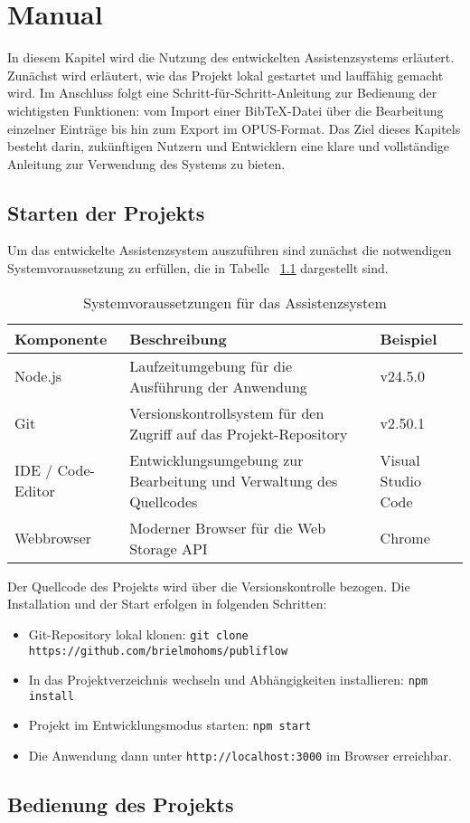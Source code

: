 \chapter{Manual}
In diesem Kapitel wird die Nutzung des entwickelten Assistenzsystems erläutert. 
Zunächst wird erläutert, wie das Projekt lokal gestartet und lauffähig gemacht 
wird. Im Anschluss folgt eine Schritt-für-Schritt-Anleitung zur Bedienung der 
wichtigsten Funktionen: vom Import einer BibTeX-Datei über die Bearbeitung 
einzelner Einträge bis hin zum Export im OPUS-Format. Das Ziel dieses Kapitels 
besteht darin, zukünftigen Nutzern und Entwicklern eine klare und vollständige 
Anleitung zur Verwendung des Systems zu bieten.


\section{Starten der Projekts}
Um das entwickelte Assistenzsystem auszuführen sind zunächst
die notwendigen Systemvoraussetzung zu erfüllen, die in Tabelle
~\ref{tab:systemvoraussetzungen} dargestellt sind. 

\begin{table}[h]
\centering
\begin{tabular}{|l|p{8cm}|l|}
\hline
\textbf{Komponente} & \textbf{Beschreibung} & \textbf{Beispiel} \\
\hline
Node.js & Laufzeitumgebung für die Ausführung der Anwendung & v24.5.0 \\
\hline
Git & Versionskontrollsystem für den Zugriff auf das Projekt-Repository & v2.50.1 \\
\hline
IDE / Code-Editor & Entwicklungsumgebung zur Bearbeitung und Verwaltung des Quellcodes & Visual Studio Code \\
\hline
Webbrowser & Moderner Browser für die Web Storage API & Chrome \\
\hline
\end{tabular}
\caption{Systemvoraussetzungen für das Assistenzsystem}
\label{tab:systemvoraussetzungen}
\end{table}

Der Quellcode des Projekts wird über die Versionskontrolle bezogen. Die Installation und der Start erfolgen in folgenden Schritten:

\begin{itemize}
    \item Git-Repository lokal klonen: \texttt{git clone https://github.com/brielmohoms/publiflow}

    \item In das Projektverzeichnis wechseln und Abhängigkeiten installieren: \texttt{npm install}

    \item Projekt im Entwicklungsmodus starten: \texttt{npm start}

    \item Die Anwendung dann unter \texttt{http://localhost:3000} im Browser erreichbar.
\end{itemize}


\section{Bedienung des Projekts}